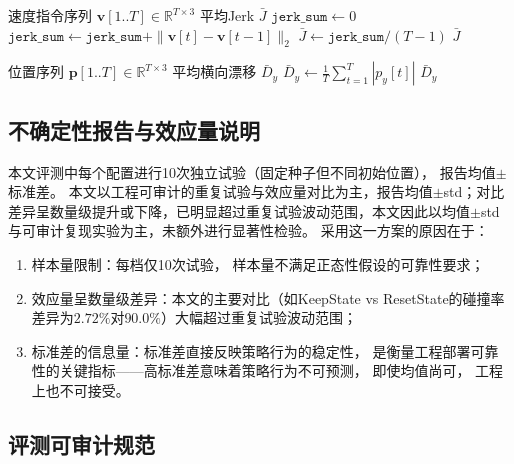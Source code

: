 \begin{algorithm}[htbp]
\caption{Command Jerk计算}
\label{alg:jerk_calc}
\begin{algorithmic}[1]
\Require 速度指令序列 $\mathbf{v}[1..T] \in \mathbb{R}^{T \times 3}$
\Ensure 平均Jerk $\bar{J}$
\State $\texttt{jerk\_sum} \leftarrow 0$
  \State $\texttt{jerk\_sum} \leftarrow \texttt{jerk\_sum} + \|\mathbf{v}[t] - \mathbf{v}[t-1]\|_2$
\EndFor
\State $\bar{J} \leftarrow \texttt{jerk\_sum} / (T - 1)$
\State \Return $\bar{J}$
\end{algorithmic}
\end{algorithm}

\begin{algorithm}[htbp]
\caption{横向漂移（Mean Y Drift）计算}
\label{alg:drift_calc}
\begin{algorithmic}[1]
\Require 位置序列 $\mathbf{p}[1..T] \in \mathbb{R}^{T \times 3}$
\Ensure 平均横向漂移 $\bar{D}_y$
\State $\bar{D}_y \leftarrow \frac{1}{T} \sum_{t=1}^{T} |p_y[t]|$ 
\State \Return $\bar{D}_y$
\end{algorithmic}
\end{algorithm}

\subsection{不确定性报告与效应量说明}

本文评测中每个配置进行10次独立试验（固定种子但不同初始位置），
报告均值$\pm$标准差。
本文以工程可审计的重复试验与效应量对比为主，报告均值$\pm$std；对比差异呈数量级提升或下降，已明显超过重复试验波动范围，本文因此以均值$\pm$std与可审计复现实验为主，未额外进行显著性检验。
采用这一方案的原因在于：

\begin{enumerate}
  \item 样本量限制：每档仅10次试验，
    样本量不满足正态性假设的可靠性要求；
 \item 效应量呈数量级差异：本文的主要对比（如KeepState vs ResetState的碰撞率差异为$2.72\%$对$90.0\%$）大幅超过重复试验波动范围；
     \item 标准差的信息量：标准差直接反映策略行为的稳定性，
    是衡量工程部署可靠性的关键指标——高标准差意味着策略行为不可预测，
    即使均值尚可，
    工程上也不可接受。
     \end{enumerate}

\subsection{评测可审计规范}

